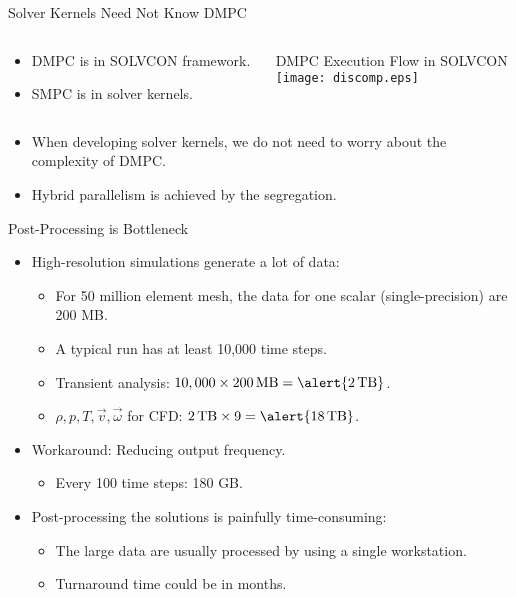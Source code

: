 \documentclass[dvips,xcolor=pst,14pt]{beamer}
\begin{document}
\begin{frame}{
%
Solver Kernels Need Not Know DMPC
%
}
\begin{columns}[c]
\begin{column}{.3\textwidth}
\begin{itemize}
  \item DMPC is in SOLVCON framework.
  \item SMPC is in solver kernels.
\end{itemize}
\end{column}
\begin{column}{.7\textwidth} \centering \footnotesize
  DMPC Execution Flow in SOLVCON \\
  \texttt{[image: discomp.eps]}
\end{column}
\end{columns}
\begin{itemize}
  \item When developing solver kernels, we do not need to worry about the
  complexity of DMPC.
  \item Hybrid parallelism is achieved by the segregation.
\end{itemize}
\end{frame}

\begin{frame}{
%
Post-Processing is Bottleneck
%
}
\begin{itemize}
  \item High-resolution simulations generate a lot of data:
  \begin{itemize}
    \item For 50 million element mesh, the data for one scalar
    (single-precision) are \alert{200 MB}.
    \item A typical run has at least 10,000 time steps.
    \item Transient analysis: $10,000 \times 200 \,\mbox{MB} = \alert{2
    \,\mbox{TB}}$.
    \item $\rho, p, T, \vec{v}, \vec{\omega}$ for CFD: $2 \,\mbox{TB} \times 9 =
    \alert{18 \,\mbox{TB}}$.
  \end{itemize}
  \item Workaround: Reducing output frequency.
  \begin{itemize}
    \item Every 100 time steps: \alert{180 GB}.
  \end{itemize}
  \item Post-processing the solutions is painfully time-consuming:
  \begin{itemize}
    \item The large data are usually processed by using a single workstation.
    \item Turnaround time could be in months.
  \end{itemize}
\end{itemize}
\end{frame}
\end{document}
